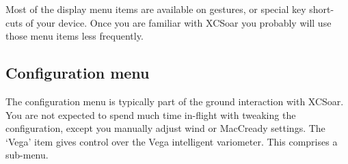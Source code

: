 Most of the display menu items are available on gestures, or special key
short-cuts of your device. Once you are familiar with XCSoar you probably
will use those menu items less frequently.

\subsection*{Configuration menu}
\noindent{}

The configuration menu is typically part of the ground interaction with
XCSoar. You are not expected to spend much time in-flight with tweaking
the configuration, except you manually adjust wind or MacCready settings.
The `Vega' item gives control over the  Vega intelligent variometer. This
comprises a sub-menu.


